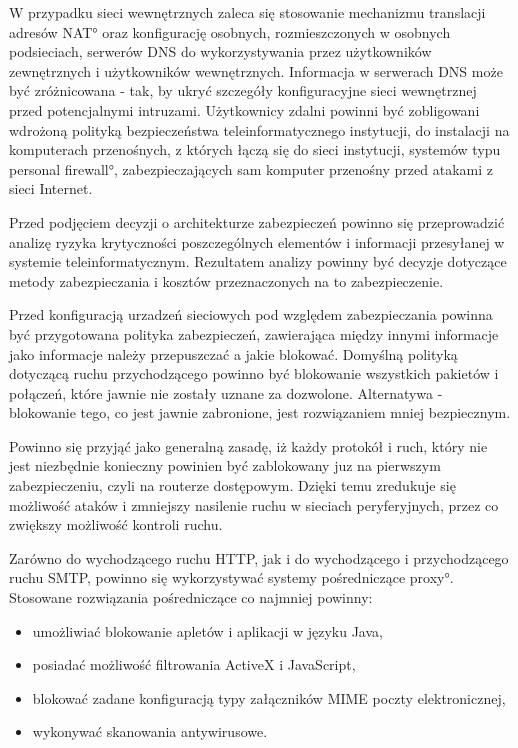 W przypadku sieci wewnętrznych zaleca się stosowanie mechanizmu translacji
adresów \ang{NAT} oraz konfigurację osobnych, rozmieszczonych w osobnych
podsieciach, serwerów DNS do wykorzystywania przez użytkowników zewnętrznych
i użytkowników wewnętrznych.  Informacja w serwerach DNS może być
zróżnicowana - tak, by ukryć szczegóły konfiguracyjne sieci wewnętrznej
przed potencjalnymi intruzami.  Użytkownicy zdalni powinni być zobligowani
wdrożoną polityką bezpieczeństwa teleinformatycznego instytucji, do
instalacji na komputerach przenośnych, z których łączą się do sieci
instytucji, systemów typu  \ang{personal
firewall}, zabezpieczających sam komputer przenośny przed atakami z sieci
Internet.

Przed podjęciem decyzji o architekturze zabezpieczeń powinno się
przeprowadzić analizę ryzyka krytyczności poszczególnych elementów i
informacji przesyłanej w systemie teleinformatycznym. Rezultatem analizy
powinny być decyzje dotyczące metody zabezpieczania i kosztów przeznaczonych
na to zabezpieczenie.

Przed konfiguracją urzadzeń sieciowych pod względem zabezpieczania powinna
być przygotowana polityka zabezpieczeń, zawierająca między innymi informacje
jako informacje należy przepuszczać a jakie blokować. Domyślną polityką
dotyczącą ruchu przychodzącego powinno być blokowanie wszystkich pakietów i
połączeń, które jawnie nie zostały uznane za dozwolone. Alternatywa -
blokowanie tego, co jest jawnie zabronione, jest rozwiązaniem mniej
bezpiecznym.

Powinno się przyjąć jako generalną zasadę, iż każdy protokół i ruch, który
nie jest niezbędnie konieczny powinien być zablokowany juz na pierwszym
zabezpieczeniu, czyli na routerze dostępowym. Dzięki temu zredukuje się
możliwość ataków i zmniejszy nasilenie ruchu w sieciach peryferyjnych, przez
co zwiększy możliwość kontroli ruchu.

Zarówno do wychodzącego ruchu HTTP, jak i do wychodzącego i przychodzącego
ruchu SMTP, powinno się wykorzystywać systemy pośredniczące \ang{proxy}.
Stosowane rozwiązania pośredniczące co najmniej powinny:

\begin{itemize}

\item umożliwiać blokowanie apletów i aplikacji w języku Java,

\item posiadać możliwość filtrowania ActiveX i JavaScript,

\item blokować zadane konfiguracją typy załączników MIME poczty
elektronicznej,

\item wykonywać skanowania antywirusowe.

\end{itemize}

